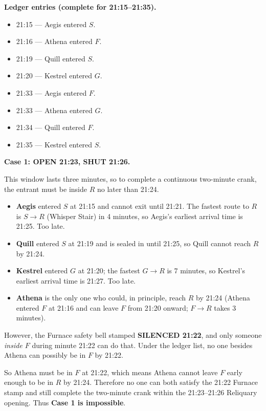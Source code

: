 \medskip

\noindent\textbf{Ledger entries (complete for 21:15--21:35).}
\begin{itemize}
\item 21:15 --- Aegis entered \(S\).
\item 21:16 --- Athena entered \(F\).
\item 21:19 --- Quill entered \(S\).
\item 21:20 --- Kestrel entered \(G\).
\item 21:33 --- Aegis entered \(F\).
\item 21:33 --- Athena entered \(G\).
\item 21:34 --- Quill entered \(F\).
\item 21:35 --- Kestrel entered \(S\).
\end{itemize}

\medskip


\SolutionPage
\footnotesize

\textbf{Case 1: OPEN 21:23, SHUT 21:26.}


This window lasts three minutes, so to complete a continuous two-minute crank, the entrant must be inside \(R\) no later than 21:24.

\begin{itemize}
\item \textbf{Aegis} entered \(S\) at 21:15 and cannot exit until 21:21. The fastest route to \(R\) is \(S\to R\) (Whisper Stair) in 4 minutes, so Aegis’s earliest arrival time is 21:25. Too late.
\item \textbf{Quill} entered \(S\) at 21:19 and is sealed in until 21:25, so Quill cannot reach \(R\) by 21:24.
\item \textbf{Kestrel} entered \(G\) at 21:20; the fastest \(G\to R\) is 7 minutes, so Kestrel’s earliest arrival time is 21:27. Too late.
\item \textbf{Athena} is the only one who could, in principle, reach \(R\) by 21:24 (Athena entered \(F\) at 21:16 and can leave \(F\) from 21:20 onward; \(F\to R\) takes 3 minutes).
\end{itemize}

However, the Furnace safety bell stamped \textbf{SILENCED 21:22}, and only someone \emph{inside \(F\)} during minute 21:22 can do that. Under the ledger list, no one besides Athena can possibly be in \(F\) by 21:22.

So Athena must be in \(F\) at 21:22, which means Athena cannot leave \(F\) early enough to be in \(R\) by 21:24. Therefore no one can both satisfy the 21:22 Furnace stamp and still complete the two-minute crank within the 21:23--21:26 Reliquary opening. Thus \textbf{Case 1 is impossible}.

